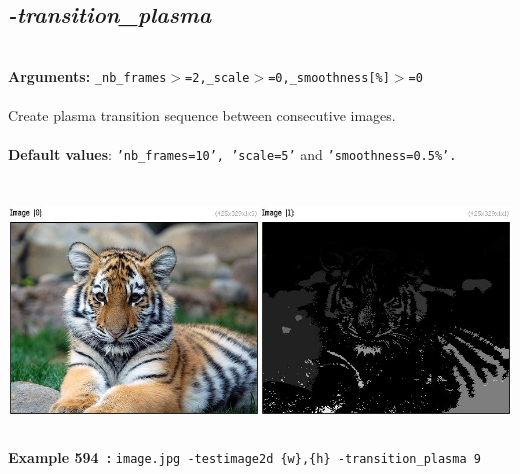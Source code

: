 \documentclass[a4paper,11pt,twoside]{book}
\begin{document}
\subsection{\emph{-transition\_plasma} }\vspace*{-0.5em}
~\\\textbf{Arguments: } 
{\small \texttt{\_nb\_frames$>$=2,\_scale$>$=0,\_smoothness[\%]$>$=0}}\\~\\
Create plasma transition sequence between consecutive images.
~\\~\\\textbf{Default values}: {\small \texttt{'nb\_frames=10', 'scale=5'} and \texttt{'smoothness=0.5\%'.}}
\begin{center}\includegraphics[keepaspectratio=true,height=7cm,width=\textwidth]{img/gmic_def594.jpg}\\
{\footnotesize \textbf{Example 594~:} \texttt{image.jpg -testimage2d \{w\},\{h\} -transition\_plasma 9}}
\end{center}
\end{document}
